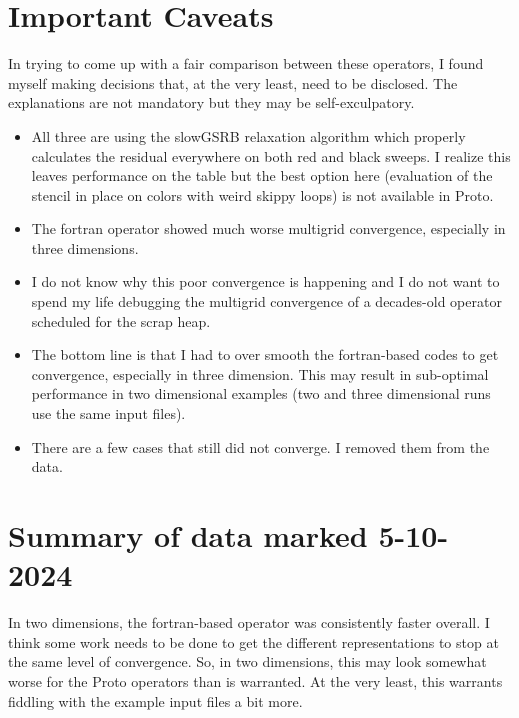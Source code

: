 \documentclass{article}
\begin{document}
\section{Important Caveats}
In trying to come up with a fair comparison between these operators, I
found myself making decisions that, at the very least, need to be
disclosed.  The explanations are not mandatory but they may be
self-exculpatory.
\begin{itemize}
\item All three are using the slowGSRB relaxation algorithm which
  properly calculates the residual everywhere on both red and black
  sweeps.    I realize this leaves performance on the table but the
  best option here (evaluation of the stencil in place on colors with
  weird skippy loops) is not available in Proto.
\item The fortran operator showed much worse multigrid convergence,
  especially in three dimensions.
\item  I do not know why this poor convergence is happening and I do not want
  to spend my life debugging the multigrid convergence of a
  decades-old operator scheduled for the scrap heap.
\item The bottom line is that I had to over smooth the fortran-based codes to get
  convergence, especially in three dimension.   This may result in
  sub-optimal performance in two dimensional examples (two and three
  dimensional runs use the same input files).
\item There are a few cases that still did not converge.   I removed
  them from the data.
\end{itemize}

\section{Summary of data marked 5-10-2024}

In two dimensions, the fortran-based operator was consistently faster
overall.   I think some work needs to be done to get the different
representations to stop at the same level of convergence.  So, in two
dimensions, this may look somewhat worse for the Proto operators than
is warranted.   At the very least, this warrants  fiddling  with the
example input files a bit more.
\end{document}
